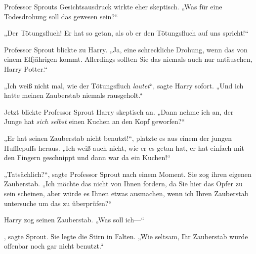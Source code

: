 Professor Sprouts Gesichtsausdruck wirkte eher skeptisch. „Was für eine Todesdrohung soll das gewesen sein?“

„Der Tötungsfluch! Er hat so getan, als ob er den Tötungsfluch auf uns spricht!“

Professor Sprout blickte zu Harry. „Ja, eine schreckliche Drohung, wenn das von einem Elfjährigen kommt. Allerdings sollten Sie das niemals auch nur antäuschen, Harry Potter.“

„Ich weiß nicht mal, wie der Tötungsfluch \emph{lautet}“, sagte Harry sofort. „Und ich hatte meinen Zauberstab niemals rausgeholt.“

Jetzt blickte Professor Sprout Harry skeptisch an. „Dann nehme ich an, der Junge hat \emph{sich selbst} einen Kuchen an den Kopf geworfen?“

„Er hat seinen Zauberstab nicht benutzt!“, platzte es aus einem der jungen Hufflepuffs heraus. „Ich weiß auch nicht, wie er es getan hat, er hat einfach mit den Fingern geschnippt und dann war da ein Kuchen!“

„Tatsächlich?“, sagte Professor Sprout nach einem Moment. Sie zog ihren eigenen Zauberstab. „Ich möchte das nicht von Ihnen fordern, da Sie hier das Opfer zu sein scheinen, aber würde es Ihnen etwas ausmachen, wenn ich Ihren Zauberstab untersuche um das zu überprüfen?“

Harry zog seinen Zauberstab. „Was soll ich—“

, sagte Sprout. Sie legte die Stirn in Falten. „Wie seltsam, Ihr Zauberstab wurde offenbar noch gar nicht benutzt.“

